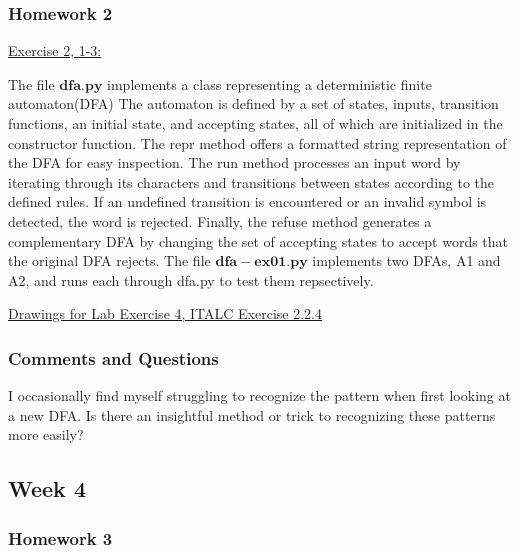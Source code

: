 \documentclass{article}
\theoremstyle{theorem}
\theoremstyle{definition}
\theoremstyle{remark}
\begin{document}
\subsubsection*{Homework 2}

\underline{Exercise 2, 1-3:}

The file $\mathbf{dfa.py}$ implements a class representing a deterministic finite automaton(DFA) The automaton is defined by a set of states, inputs, transition functions, an initial state, and accepting states, all of which are initialized in the constructor function. The repr method offers a formatted string representation of the DFA for easy inspection. The run method processes an input word by iterating through its characters and transitions between states according to the defined rules. If an undefined transition is encountered or an invalid symbol is detected, the word is rejected. Finally, the refuse method generates a complementary DFA by changing the set of accepting states to accept words that the original DFA rejects.
\newline
The file $\mathbf{dfa-ex01.py}$ implements two DFAs, A1 and A2, and runs each through dfa.py to test them repsectively.




\underline{Drawings for Lab Exercise 4, ITALC Exercise 2.2.4}



\subsubsection*{Comments and Questions}

I occasionally find myself struggling to recognize the pattern when first looking at a new DFA. Is there an insightful method or trick to recognizing these patterns more easily?

\subsection{Week 4}


\subsubsection*{Homework 3}
\end{document}

